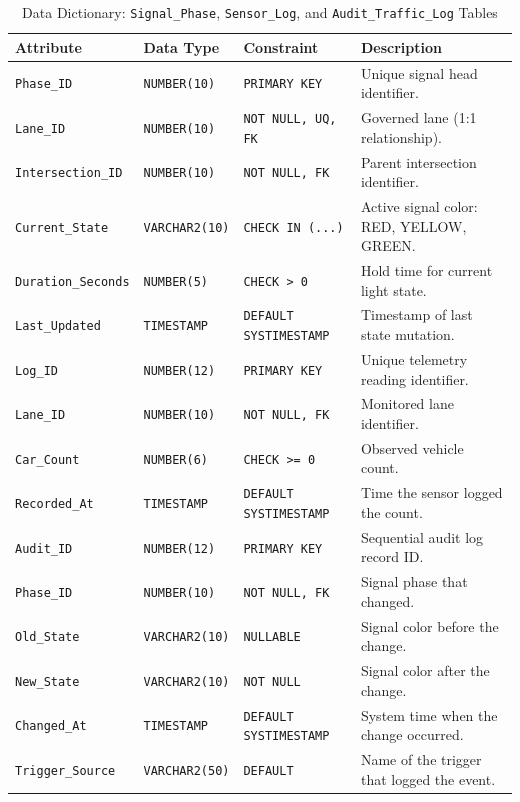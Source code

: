 \documentclass[11pt,a4paper]{article}
\begin{document}
\begin{table}[H]
\centering
\caption{Data Dictionary: \texttt{Signal\_Phase}, \texttt{Sensor\_Log}, and \texttt{Audit\_Traffic\_Log} Tables}
\label{tab:dict2}
\footnotesize
\begin{tabularx}{\textwidth}{lllX}
\toprule
\textbf{Attribute} & \textbf{Data Type} & \textbf{Constraint} & \textbf{Description} \\
\midrule
\texttt{Phase\_ID}        & \texttt{NUMBER(10)} & \texttt{PRIMARY KEY} & Unique signal head identifier. \\
\texttt{Lane\_ID}         & \texttt{NUMBER(10)} & \texttt{NOT NULL, UQ, FK} & Governed lane (1:1 relationship). \\
\texttt{Intersection\_ID} & \texttt{NUMBER(10)} & \texttt{NOT NULL, FK} & Parent intersection identifier. \\
\texttt{Current\_State}   & \texttt{VARCHAR2(10)} & \texttt{CHECK IN (...)} & Active signal color: RED, YELLOW, GREEN. \\
\texttt{Duration\_Seconds}& \texttt{NUMBER(5)} & \texttt{CHECK > 0} & Hold time for current light state. \\
\texttt{Last\_Updated}    & \texttt{TIMESTAMP} & \texttt{DEFAULT SYSTIMESTAMP} & Timestamp of last state mutation. \\
\midrule
\texttt{Log\_ID}          & \texttt{NUMBER(12)} & \texttt{PRIMARY KEY} & Unique telemetry reading identifier. \\
\texttt{Lane\_ID}         & \texttt{NUMBER(10)} & \texttt{NOT NULL, FK} & Monitored lane identifier. \\
\texttt{Car\_Count}       & \texttt{NUMBER(6)} & \texttt{CHECK >= 0} & Observed vehicle count. \\
\texttt{Recorded\_At}     & \texttt{TIMESTAMP} & \texttt{DEFAULT SYSTIMESTAMP} & Time the sensor logged the count. \\
\midrule
\texttt{Audit\_ID}        & \texttt{NUMBER(12)} & \texttt{PRIMARY KEY} & Sequential audit log record ID. \\
\texttt{Phase\_ID}        & \texttt{NUMBER(10)} & \texttt{NOT NULL, FK} & Signal phase that changed. \\
\texttt{Old\_State}       & \texttt{VARCHAR2(10)} & \texttt{NULLABLE} & Signal color before the change. \\
\texttt{New\_State}       & \texttt{VARCHAR2(10)} & \texttt{NOT NULL} & Signal color after the change. \\
\texttt{Changed\_At}      & \texttt{TIMESTAMP} & \texttt{DEFAULT SYSTIMESTAMP} & System time when the change occurred. \\
\texttt{Trigger\_Source}  & \texttt{VARCHAR2(50)} & \texttt{DEFAULT} & Name of the trigger that logged the event. \\
\bottomrule
\end{tabularx}
\end{table}
\end{document}
